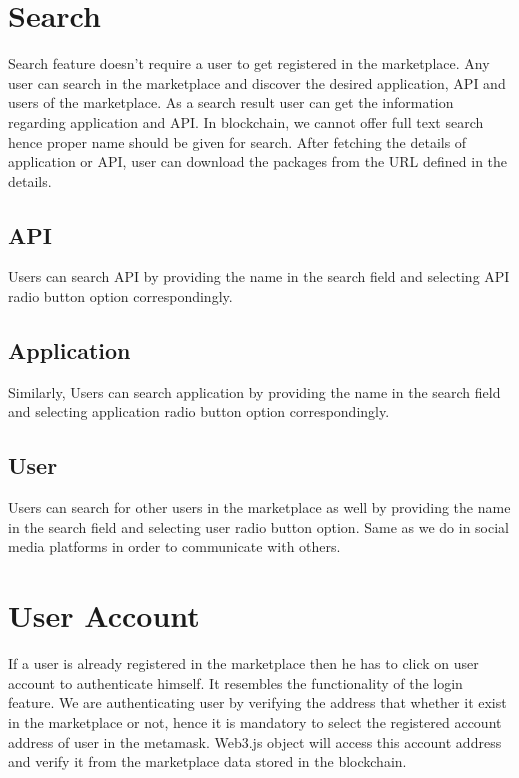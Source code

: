 \section{Search} Search feature doesn't require a user to get registered in the marketplace. Any user can search in the marketplace and discover the desired application, API and users of the marketplace. As a search result user can get the information regarding application and API. In blockchain, we cannot offer full text search hence proper name should be given for search. After fetching the details of application or API, user can download the packages from the URL defined in the details.\\

\subsection {API}
Users can search API by providing the name in the search field and selecting API radio button option correspondingly.
\subsection {Application}
Similarly, Users can search application by providing the name in the search field and selecting application radio button option correspondingly.
\subsection {User}
Users can search for other users in the marketplace as well by providing the name in the search field and selecting user radio button option. Same as we do in social media platforms in order to communicate with others.
\section{User Account} If a user is already registered in the marketplace then he has to click on user account to authenticate himself. It resembles the functionality of the login feature. We are authenticating user by verifying the address that whether it exist in the marketplace or not, hence it is mandatory to select the registered account address of user in the metamask. Web3.js object will access this account address and verify it from the marketplace data stored in the blockchain.

